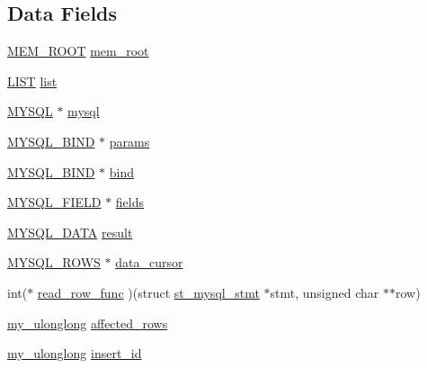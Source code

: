 \subsection*{Data Fields}
\begin{DoxyCompactItemize}
\item 
\hyperlink{my__alloc_8h_ac59e289b254a2c5ac634ffcedda3f823}{M\+E\+M\+\_\+\+R\+O\+O\+T} \hyperlink{structst__mysql__stmt_a292686a1de9fdbddc3963bcf20249cb0}{mem\+\_\+root}
\item 
\hyperlink{my__list_8h_ab2a1c5fd766481fe9ec169b9fdca184e}{L\+I\+S\+T} \hyperlink{structst__mysql__stmt_aac96a0c9f7a07434da3d798f3b2ece87}{list}
\item 
\hyperlink{mysql_8h_a42e5b5e53a1263817a59e42e219feca6}{M\+Y\+S\+Q\+L} $\ast$ \hyperlink{structst__mysql__stmt_a224349871acc052c72cfa86f5901c809}{mysql}
\item 
\hyperlink{mysql_8h_a4cec8aef3d6aab1d7d9d8e4f2a90457d}{M\+Y\+S\+Q\+L\+\_\+\+B\+I\+N\+D} $\ast$ \hyperlink{structst__mysql__stmt_a0276e0f80817dccc03611786fd646ec7}{params}
\item 
\hyperlink{mysql_8h_a4cec8aef3d6aab1d7d9d8e4f2a90457d}{M\+Y\+S\+Q\+L\+\_\+\+B\+I\+N\+D} $\ast$ \hyperlink{structst__mysql__stmt_a5651622ae4c2c31616aa648b70cc12b2}{bind}
\item 
\hyperlink{mysql_8h_ad010774d7ae34dc28a2e044ed2cd4f71}{M\+Y\+S\+Q\+L\+\_\+\+F\+I\+E\+L\+D} $\ast$ \hyperlink{structst__mysql__stmt_a1d7627383d3c0ab2989968d88c2bb83d}{fields}
\item 
\hyperlink{mysql_8h_a19837b8e2f5cec429a5b61d4d5c68ed6}{M\+Y\+S\+Q\+L\+\_\+\+D\+A\+T\+A} \hyperlink{structst__mysql__stmt_a198cbcc8f7faf73522a281dec2e1e434}{result}
\item 
\hyperlink{mysql_8h_a4d0140764825a51eae874c641df1afb5}{M\+Y\+S\+Q\+L\+\_\+\+R\+O\+W\+S} $\ast$ \hyperlink{structst__mysql__stmt_ad1663e8fd4bab5be184b6cd38d3296f8}{data\+\_\+cursor}
\item 
int($\ast$ \hyperlink{structst__mysql__stmt_a908e910a9ff3cf311f2a34408179cffe}{read\+\_\+row\+\_\+func} )(struct \hyperlink{structst__mysql__stmt}{st\+\_\+mysql\+\_\+stmt} $\ast$stmt, unsigned char $\ast$$\ast$row)
\item 
\hyperlink{mysql_8h_ae05bd5d3e5a75578e2f14cfeb43f07aa}{my\+\_\+ulonglong} \hyperlink{structst__mysql__stmt_af168ff6c13b33aca298c39d5b128f428}{affected\+\_\+rows}
\item 
\hyperlink{mysql_8h_ae05bd5d3e5a75578e2f14cfeb43f07aa}{my\+\_\+ulonglong} \hyperlink{structst__mysql__stmt_ae1412a9a6bacafb7daf66f5fc826b54f}{insert\+\_\+id}
$$
\end{DoxyCompactItemize}
